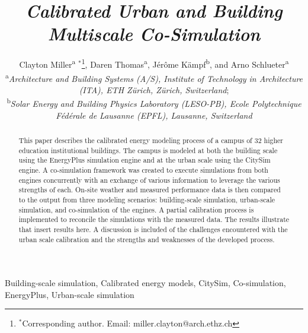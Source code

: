 \documentclass{tBPS2e}
\theoremstyle{plain}
\theoremstyle{definition}
\theoremstyle{remark}
\begin{document}


\title{\textit{Calibrated Urban and Building Multiscale Co-Simulation}}

\author{Clayton Miller\textsuperscript{a}%
$^{\ast}$\thanks{$^\ast$Corresponding author. Email: miller.clayton@arch.ethz.ch}, 
Daren Thomas\textsuperscript{a},
J\'er\^ome K\"ampf\textsuperscript{b},
and Arno Schlueter\textsuperscript{a}\\
\vspace{6pt}
\textsuperscript{a}{\em Architecture and Building Systems (A/S), Institute of Technology in Architecture (ITA), ETH Z\"urich, Z\"urich, Switzerland};\\
\textsuperscript{b}{\em Solar Energy and Building Physics Laboratory (LESO-PB), Ecole Polytechnique F\'ed\'erale de Lausanne (EPFL), Lausanne, Switzerland}
}

\maketitle

\begin{abstract}
This paper describes the calibrated energy modeling process of a campus of 32 higher education institutional buildings. The campus is modeled at both the building scale using the EnergyPlus simulation engine and at the urban scale using the CitySim engine. A co-simulation framework was created to execute simulations from both engines concurrently with an exchange of various information to leverage the various strengths of each. On-site weather and measured performance data is then compared to the output from three modeling scenarios: building-scale simulation, urban-scale simulation, and co-simulation of the engines. A partial calibration process is implemented to reconcile the simulations with the measured data. The results illustrate that {\color{red}insert results here}. A discussion is included of the challenges encountered with the urban scale calibration and the strengths and weaknesses of the developed process.
\end{abstract}


\begin{keywords}
Building-scale simulation, Calibrated energy models, CitySim, Co-simulation, EnergyPlus, Urban-scale simulation 
\end{keywords}
\end{document}
